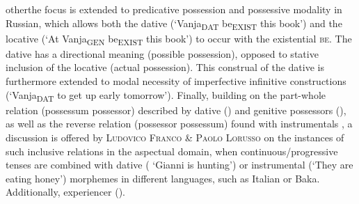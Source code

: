 \documentclass[output=paper,modfonts,nonflat]{langsci/langscibook}
\begin{document}
\begin{styleBodyA}
 otherthe focus is extended to predicative possession and possessive modality in Russian, which allows both the dative (‘Vanja\textsc{\textsubscript{DAT}} be\textsc{\textsubscript{EXIST}} this book’) and the locative (‘At Vanja\textsubscript{GEN} be\textsubscript{EXIST} this book’) to occur with the existential \textsc{be}. The dative has a directional meaning (possible possession), opposed to stative inclusion of the locative (actual possession). This construal of the dative is furthermore extended to modal necessity of imperfective infinitive constructions (‘Vanja\textsubscript{DAT} to get up early tomorrow’).  Finally, building on the part-whole relation (possessum \textstyleNone{${\subseteq}$} possessor) described by dative () and genitive possessors (), as well as the reverse relation (possessor \textstyleNone{${\supseteq}$} possessum) found with instrumentals , a discussion is offered by \textsc{Ludovico} \textsc{Franco} \textsc{\&} \textsc{Paolo} \textsc{Lorusso} on the instances of such inclusive relations in the aspectual domain, when continuous/progressive tenses are combined with dative ( ‘Gianni is hunting’) or instrumental (‘They are eating honey’) morphemes in different languages, such as Italian or Baka. Additionally, experiencer ().
\end{styleBodyA}
\end{document}
